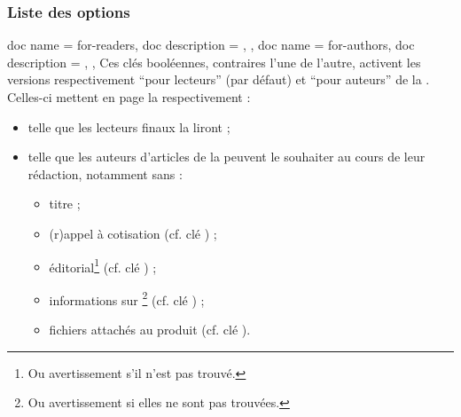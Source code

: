 \documentclass{letgut}
\begin{document}
\subsubsection{Liste des options}
\label{sec:liste-des-options}

\begin{docKeys}
  {
    {
      doc name = for-readers,
      doc description = {},
    },
    {
      doc name = for-authors,
      doc description = {},
    },
  }%
  Ces clés booléennes, contraires l'une de l'autre, activent les versions
  respectivement \enquote{pour lecteurs} (par défaut) et \enquote{pour auteurs}
  de la . Celles-ci mettent en page la  respectivement :
  \begin{itemize}
  \item telle que les lecteurs finaux la liront ;
  \item telle que les auteurs d'articles de la  peuvent le souhaiter au
    cours de leur rédaction, notamment sans :
    \begin{itemize}
    \item titre ;
    \item (r)appel à cotisation (cf. clé ) ;
    \item éditorial\footnote{Ou avertissement s'il n'est pas trouvé.} (cf. clé
      ) ;
    \item informations sur \gut{}\footnote{Ou avertissement si elles ne sont pas
        trouvées.}  (cf. clé ) ;
    \item fichiers attachés au \pdf{} produit (cf. clé
      ).
    \end{itemize}
  \end{itemize}
\end{docKeys}
\end{document}
